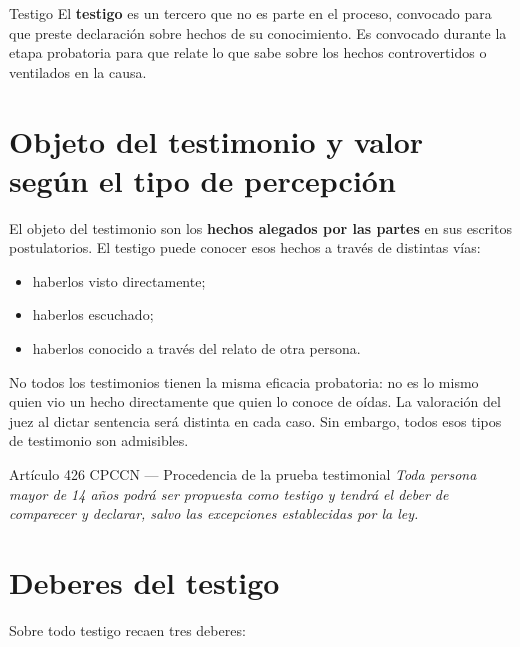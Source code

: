 \documentclass[12pt,oneside]{book}
\begin{document}
\begin{definition}{Testigo}
El \textbf{testigo} es un tercero que no es parte en el proceso, convocado para que preste declaración sobre hechos de su conocimiento. Es convocado durante la etapa probatoria para que relate lo que sabe sobre los hechos controvertidos o ventilados en la causa.
\end{definition}

\section{Objeto del testimonio y valor según el tipo de percepción}

El objeto del testimonio son los \textbf{hechos alegados por las partes} en sus escritos postulatorios. El testigo puede conocer esos hechos a través de distintas vías:
\begin{itemize}
    \item haberlos visto directamente;
    \item haberlos escuchado;
    \item haberlos conocido a través del relato de otra persona.
\end{itemize}

No todos los testimonios tienen la misma eficacia probatoria: no es lo mismo quien vio un hecho directamente que quien lo conoce de oídas. La valoración del juez al dictar sentencia será distinta en cada caso. Sin embargo, todos esos tipos de testimonio son admisibles.

\begin{norma}{Artículo 426 CPCCN --- Procedencia de la prueba testimonial}
\textit{Toda persona mayor de 14 años podrá ser propuesta como testigo y tendrá el deber de comparecer y declarar, salvo las excepciones establecidas por la ley.}
\end{norma}

\section{Deberes del testigo}

Sobre todo testigo recaen tres deberes:
\end{document}
